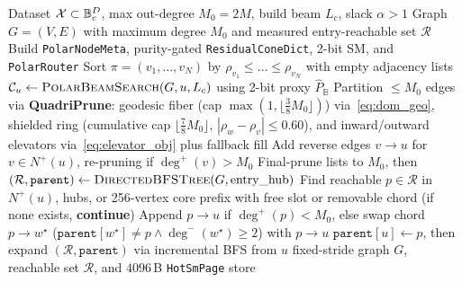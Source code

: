 \begin{algorithm}[t]
\caption{Warped-Product Construction \& Chord-Swap Repair}
\label{alg:compass_build}
\footnotesize
\begin{algorithmic}[1]
\Require Dataset $\mathcal{X} \subset \mathbb{B}_c^D$, max out-degree $M_0 = 2M$, build beam $L_c$, slack $\alpha > 1$
\Ensure Graph $G = (V, E)$ with maximum degree $M_0$ and measured entry-reachable set $\mathcal{R}$
\State Build \texttt{PolarNodeMeta}, purity-gated \texttt{ResidualConeDict}, 2-bit {SM}, and \texttt{PolarRouter}
\State Sort $\pi = (v_1, \dots, v_N)$ by $\rho_{v_1} \le \dots \le \rho_{v_N}$ with empty adjacency lists
    \State $\mathcal{C}_u \gets \textsc{PolarBeamSearch}(G, u, L_c)$ using 2-bit proxy $\widehat{P}_{\mathbb{B}}$
    \State Partition $\le M_0$ edges via \textbf{QuadriPrune}: geodesic fiber (cap $\max(1, \lfloor \frac{3}{8}M_0\rfloor)$) via~\eqref{eq:dom_geo}, shielded ring (cumulative cap $\lfloor \frac{7}{8}M_0\rfloor$, $|\rho_w - \rho_v| \le 0.60$), and inward/outward elevators via~\eqref{eq:elevator_obj} plus fallback fill
    \State Add reverse edges $v \to u$ for $v \in N^+(u)$, re-pruning if $\deg^+(v) > M_0$
  \EndFor
\EndFor
\State Final-prune lists to $M_0$, then $(\mathcal{R}, \texttt{parent}) \gets \textsc{DirectedBFSTree}(G, \text{entry\_hub})$
  \State Find reachable $p \in \mathcal{R}$ in $N^+(u)$, hubs, or 256-vertex core prefix with free slot or removable chord (if none exists, \textbf{continue})
  \State Append $p \to u$ if $\deg^+(p) < M_0$, else swap chord $p \to w^\star$ ($\texttt{parent}[w^\star] \ne p \land \deg^-(w^\star) \ge 2$) with $p \to u$
  \State $\texttt{parent}[u] \gets p$, then expand $(\mathcal{R}, \texttt{parent})$ via incremental {BFS} from $u$
\EndFor
\State \Return fixed-stride graph $G$, reachable set $\mathcal{R}$, and $4096$\,B \texttt{HotSmPage} store
\end{algorithmic}
\end{algorithm}

